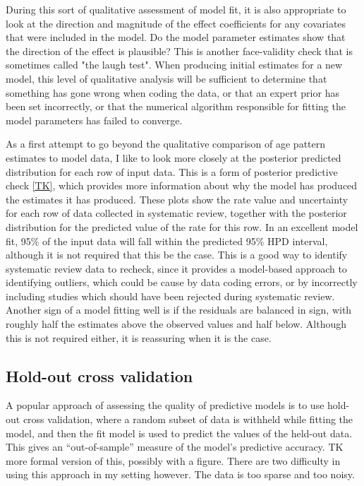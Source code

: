 During this sort of qualitative assessment of model fit, it is also
appropriate to look at the direction and magnitude of the effect
coefficients for any covariates that were included in the model.  Do
the model parameter estimates show that the direction of the effect is
plausible?  This is another face-validity check that is sometimes
called "the laugh test".  When producing initial estimates for a new
model, this level of qualitative analysis will be sufficient to determine
that something has gone wrong when coding the data, or that an expert
prior has been set incorrectly, or that the numerical algorithm
responsible for fitting the model parameters has failed to converge.

As a first attempt to go beyond the qualitative comparison of age
pattern estimates to model data, I like to look more closely at the
posterior predicted distribution for each row of input data.  This is
a form of posterior predictive check \ref{TK}, which provides more
information about why the model has produced the estimates it has produced.
These plots show the rate value and uncertainty for each row of data
collected in systematic review, together with the posterior
distribution for the predicted value of the rate for this row.  In an
excellent model fit, 95\% of the input data will fall within the 
predicted 95\% HPD interval, although it is not required that this be
the case.    This is a good way to identify systematic review data to
recheck, since it provides a model-based approach to identifying
outliers, which could be cause by data coding errors, or by
incorrectly including studies which should have been rejected during
systematic review.  Another sign of a model fitting well is if the residuals
are balanced in sign, with roughly half the estimates above the
observed values and half below.  Although this is not required either,
it is reassuring when it is the case.


\subsection{Hold-out cross validation}
A popular approach of assessing the quality of predictive models is to
use hold-out cross validation, where a random subset of data is
withheld while fitting the model, and then the fit model is used to
predict the values of the held-out data.  This gives an
``out-of-sample'' measure of the model's predictive accuracy.  TK more
formal version of this, possibly with a figure. There are two
difficulty in using this approach in my setting however.  The data is
too sparse and too noisy.


